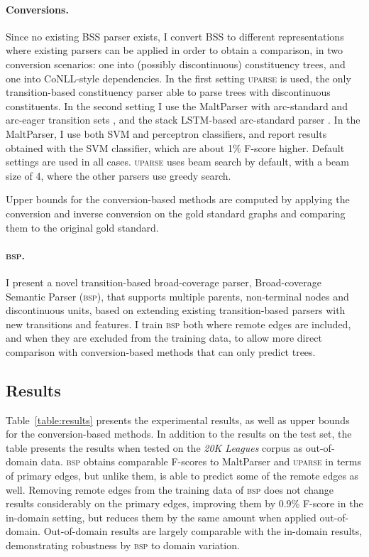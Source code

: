 \documentclass[12pt]{article}
\begin{document}
\paragraph{Conversions.}
Since no existing BSS parser exists, I convert BSS to different representations where
existing parsers can be applied in order to obtain a comparison, in
two conversion scenarios: one into (possibly discontinuous) constituency trees,
and one into CoNLL-style dependencies. In the first setting \textsc{uparse} is used,
the only transition-based constituency parser able to parse trees with
discontinuous constituents.
In the second setting I use the MaltParser with arc-standard and
arc-eager transition sets \cite{nivre2007maltparser},
and the stack LSTM-based arc-standard parser \cite{dyer2015transition}.
In the MaltParser, I use both SVM and perceptron classifiers, and report
results obtained with the SVM classifier, which are about 1\% F-score higher.
Default settings are used in all cases.
\textsc{uparse} uses beam search by default,
with a beam size of 4, where the other parsers use greedy search.

Upper bounds for the conversion-based methods are computed by applying
the conversion and inverse conversion on the gold standard
graphs and comparing them to the original gold standard.

\paragraph{\textsc{bsp}.}
I present a novel transition-based broad-coverage parser,
Broad-coverage Semantic Parser (\textsc{bsp}), that supports multiple parents,
non-terminal nodes and discontinuous units, based on extending existing
transition-based parsers with new transitions and features.
I train \textsc{bsp} both where remote edges
are included, and when they are excluded from the training data, to allow
more direct comparison with conversion-based methods that can only
predict trees.


\subsection{Results}\label{sec:results}

Table~\ref{table:results} presents the experimental results, as well as
upper bounds for the conversion-based methods.
In addition to the results on the test set,
the table presents the results when tested on the \textit{20K Leagues} corpus as out-of-domain data.
\textsc{bsp} obtains comparable F-scores to MaltParser and \textsc{uparse}
in terms of primary edges, but unlike them, is able to predict some
of the remote edges as well. 
Removing remote edges from the training data of \textsc{bsp} does not
change results considerably on the primary edges,
improving them by 0.9\% F-score in the in-domain setting, but reduces
them by the same amount when applied out-of-domain. 
Out-of-domain results are largely comparable with the in-domain
results, demonstrating robustness by \textsc{bsp}
to domain variation.
\end{document}

